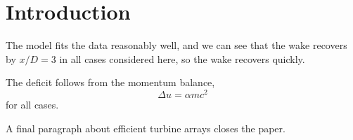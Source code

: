 \documentclass{article}
\begin{document}
\section{Introduction}


The model fits the data reasonably well, and we can see that the wake
recovers by $x/D=3$ in all cases considered here, so the wake recovers
quickly.

The deficit follows from the momentum balance,
\begin{equation}
  \Delta u = \alpha m c^2
\end{equation}
for all cases.

A final paragraph about efficient turbine arrays closes the paper.
\end{document}
